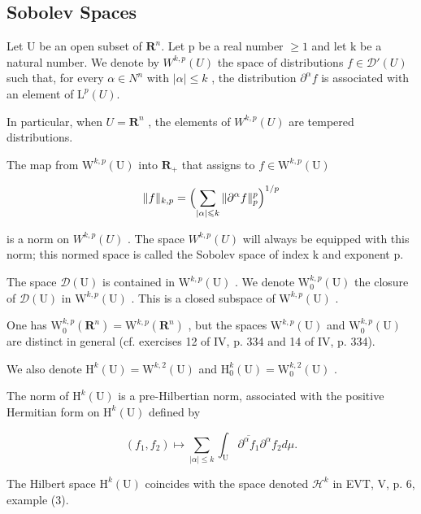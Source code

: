 \subsection{Sobolev Spaces}

Let U be an open subset of \(\mathbf{R}^{n} \). Let p be a real number \(\geqslant 1\) and let k be a natural number. We denote by \(W^{k,p}(U)\) the space of distributions \(f \in \mathcal{D}'(U)\) such that, for every \(\alpha \in N^{n}\) with \(|\alpha| \leqslant k\) , the distribution \(\partial^{\alpha}f\) is associated with an element of \(\mathrm{L}^{p}(U) \).

In particular, when \(U = \mathbf{R}^{n}\) , the elements of \(W^{k,p}(U)\) are tempered distributions.

The map from \(\mathrm{W}^{k,p}(\mathrm{U})\) into \(\mathbf{R}_{+}\) that assigns to \(f\in \mathrm{W}^{k,p}(\mathrm{U})\)

\[
\| f \| _ {k, p} = \Bigl (\sum_ {| \alpha | \leqslant k} \| \partial^ {\alpha} f \| _ {p} ^ {p} \Bigr) ^ {1 / p}
\]

is a norm on \(W^{k,p}(U)\) . The space \(W^{k,p}(U)\) will always be equipped with this norm; this normed space is called the Sobolev space of index k and exponent p.

The space \(\mathcal{D}(\mathrm{U})\) is contained in \(\mathrm{W}^{k,p}(\mathrm{U})\) . We denote \(\mathrm{W}_0^{k,p}(\mathrm{U})\) the closure of \(\mathcal{D}(\mathrm{U})\) in \(\mathrm{W}^{k,p}(\mathrm{U})\) . This is a closed subspace of \(\mathrm{W}^{k,p}(\mathrm{U})\) .

One has \(\mathrm{W}_{0}^{k,p}(\mathbf{R}^{n})=\mathrm{W}^{k,p}(\mathbf{R}^{n})\) , but the spaces \(\mathrm{W}^{k,p}(\mathrm{U})\) and \(\mathrm{W}_{0}^{k,p}(\mathrm{U})\) are distinct in general (cf. exercises 12 of IV, p. 334 and 14 of IV, p. 334).

We also denote \(\mathrm{H}^k (\mathrm{U}) = \mathrm{W}^{k,2}(\mathrm{U})\) and \(\mathrm{H}_0^k (\mathrm{U}) = \mathrm{W}_0^{k,2}(\mathrm{U})\) .

The norm of \(\mathrm{H}^{k}(\mathrm{U})\) is a pre-Hilbertian norm, associated with the positive Hermitian form on \(\mathrm{H}^{k}(\mathrm{U})\) defined by

\[
\left(f _ {1}, f _ {2}\right) \mapsto \sum_ {| \alpha | \leqslant k} \int_ {\mathrm{U}} \overline {{\partial^ {\alpha} f _ {1}}} \partial^ {\alpha} f _ {2} d \mu .
\]

The Hilbert space \(\mathrm{H}^k (\mathrm{U})\) coincides with the space denoted \(\mathcal{H}^k\) in EVT, V, p. 6, example (3).

